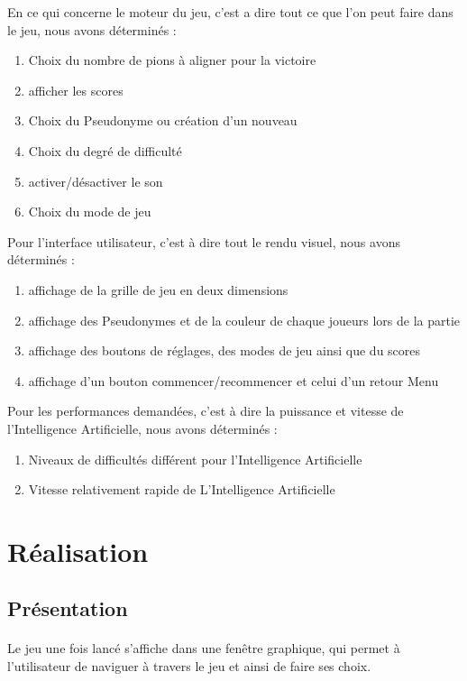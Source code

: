 \documentclass[a4paper,oneside]{article}
\begin{document}
En ce qui concerne le moteur du jeu, c'est a dire tout ce que l'on peut faire dans le jeu, nous avons déterminés :
\begin{enumerate}
    \item Choix du nombre de pions à aligner pour la victoire 
    \item afficher les scores
    \item Choix du Pseudonyme ou création d'un nouveau
    \item Choix du degré de difficulté
    \item activer/désactiver le son
    \item Choix du mode de jeu
\end{enumerate}


Pour l'interface utilisateur, c'est à dire tout le rendu visuel, nous avons déterminés :
\begin{enumerate}
	\item affichage de la grille de jeu en deux dimensions
	\item affichage des Pseudonymes et de la couleur de chaque joueurs lors de la partie
	\item affichage des boutons de réglages, des modes de jeu ainsi que du scores
	\item affichage d'un bouton commencer/recommencer et celui d'un retour Menu
\end{enumerate}


Pour les performances demandées, c'est à dire la puissance et vitesse de l'Intelligence Artificielle, nous avons déterminés :
\begin{enumerate}
	\item Niveaux de difficultés différent pour l'Intelligence Artificielle
	\item Vitesse relativement rapide de L'Intelligence Artificielle
\end{enumerate}


\clearpage




\section{Réalisation} 

\subsection{Présentation }

\paragraph{}
Le jeu une fois lancé s'affiche dans une fenêtre graphique, qui permet à l'utilisateur de naviguer à travers le jeu et ainsi de faire ses choix.
\end{document}
